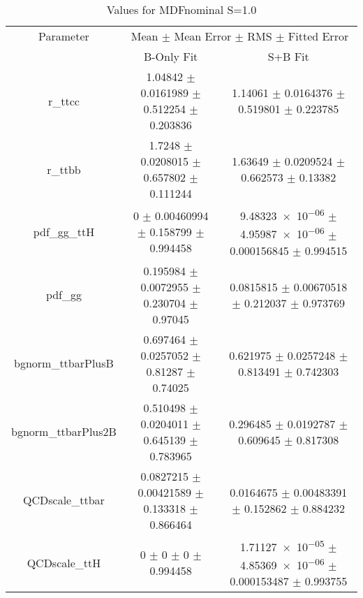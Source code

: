 \begin{table}
\centering
\caption{Values for MDFnominal S=1.0}
\begin{tabular}{ccc}
\toprule
Parameter & \multicolumn{2}{c}{Mean $\pm$ Mean Error $\pm$ RMS $\pm$ Fitted Error}\\
 & B-Only Fit & S+B Fit\\
\midrule
r\_ttcc & \num{1.04842} $\pm$ \num{0.0161989} $\pm$ \num{0.512254} $\pm$ \num{0.203836} & \num{1.14061} $\pm$ \num{0.0164376} $\pm$ \num{0.519801} $\pm$ \num{0.223785}\\
r\_ttbb & \num{1.7248} $\pm$ \num{0.0208015} $\pm$ \num{0.657802} $\pm$ \num{0.111244} & \num{1.63649} $\pm$ \num{0.0209524} $\pm$ \num{0.662573} $\pm$ \num{0.13382}\\
pdf\_gg\_ttH & \num{0} $\pm$ \num{0.00460994} $\pm$ \num{0.158799} $\pm$ \num{0.994458} & \num{9.48323e-06} $\pm$ \num{4.95987e-06} $\pm$ \num{0.000156845} $\pm$ \num{0.994515}\\
pdf\_gg & \num{0.195984} $\pm$ \num{0.0072955} $\pm$ \num{0.230704} $\pm$ \num{0.97045} & \num{0.0815815} $\pm$ \num{0.00670518} $\pm$ \num{0.212037} $\pm$ \num{0.973769}\\
bgnorm\_ttbarPlusB & \num{0.697464} $\pm$ \num{0.0257052} $\pm$ \num{0.81287} $\pm$ \num{0.74025} & \num{0.621975} $\pm$ \num{0.0257248} $\pm$ \num{0.813491} $\pm$ \num{0.742303}\\
bgnorm\_ttbarPlus2B & \num{0.510498} $\pm$ \num{0.0204011} $\pm$ \num{0.645139} $\pm$ \num{0.783965} & \num{0.296485} $\pm$ \num{0.0192787} $\pm$ \num{0.609645} $\pm$ \num{0.817308}\\
QCDscale\_ttbar & \num{0.0827215} $\pm$ \num{0.00421589} $\pm$ \num{0.133318} $\pm$ \num{0.866464} & \num{0.0164675} $\pm$ \num{0.00483391} $\pm$ \num{0.152862} $\pm$ \num{0.884232}\\
QCDscale\_ttH & \num{0} $\pm$ \num{0} $\pm$ \num{0} $\pm$ \num{0.994458} & \num{1.71127e-05} $\pm$ \num{4.85369e-06} $\pm$ \num{0.000153487} $\pm$ \num{0.993755}\\
\bottomrule
\end{tabular}
\end{table}